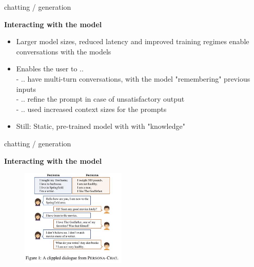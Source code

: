 \begin{vbframe}{chatting / generation}

\vfill
	
\textbf{Interacting with the model}

\begin{itemize}
	\item Larger model sizes, reduced latency and improved training regimes enable conversations with the models
	\item Enables the user to .. \\
	- .. have multi-turn conversations, with the model "remembering" previous inputs\\
	- .. refine the prompt in case of unsatisfactory output\\
	- .. used increased context sizes for the prompts
	\item Still: Static, pre-trained model with with "knowledge" 
\end{itemize}

\vfill

\end{vbframe}


\begin{vbframe}{chatting / generation}

\vfill
	
\textbf{Interacting with the model}

\begin{figure}
	\centering
		\includegraphics[width = 5cm]{figure/persona-chat.jpg}\\ 
\end{figure}

\vfill

\end{vbframe}


